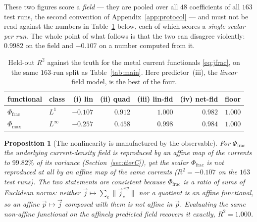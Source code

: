 \documentclass[11pt,a4paper]{article}
\theoremstyle{plain}
\newtheorem{proposition}{Proposition}
\theoremstyle{definition}
\theoremstyle{remark}
\begin{document}
These two figures score a \emph{field} --- they are pooled over all $48$
coefficients of all $163$ test runs, the second convention of
Appendix~\ref{app:protocol} --- and must not be read against the numbers in
Table~\ref{tab:tierC} below, each of which scores a \emph{single scalar per
run}. The whole point of what follows is that the two can disagree violently:
$0.9982$ on the field and $-0.107$ on a number computed from it.

\begin{table}[t]
\centering
\small
\begin{tabular}{@{}llrrrrr@{}}
\toprule
functional & class & (i) lin & (ii) quad & (iii) lin-fld & (iv) net-fld & floor \\
\midrule
$\Phi_{\mathrm{frac}}$ & $L^1$      & $-0.107$ & $0.912$ & $\mathbf{1.000}$ & $0.982$ & $1.000$ \\
$\Phi_{\max}$          & $L^\infty$ & $-0.257$ & $0.458$ & $\mathbf{0.998}$ & $0.984$ & $1.000$ \\
\bottomrule
\end{tabular}
\caption{Held-out $R^2$ against the truth for the metal current functionals
\eqref{eq:jfrac}, on the same $163$-run split as Table~\ref{tab:main}. Here
predictor~(iii), the \emph{linear} field model, is the best of the four.}
\label{tab:tierC}
\end{table}

\begin{proposition}[The nonlinearity is manufactured by the observable]
\label{prop:manufactured}
For $\Phi_{\mathrm{frac}}$ the underlying current-density \emph{field} is
reproduced by an affine map of the currents to $99.82\%$ of its variance
(Section~\ref{sec:tierC}), yet the \emph{scalar}
$\Phi_{\mathrm{frac}}$ is not reproduced at all by an affine map of the same
currents ($R^2 = -0.107$ on the $163$ test runs). The two statements are
consistent because $\Phi_{\mathrm{frac}}$ is a \emph{ratio of sums of Euclidean
norms}: neither $\vec{j}\mapsto\sum_e\|\vec{j}^{\,xy}_e\|$ nor a quotient is an
affine functional, so an affine $\vec{p}\mapsto\vec{j}$ composed with them is not
affine in $\vec{p}$. Evaluating the same non-affine functional on the affinely
predicted field recovers it exactly, $R^2 = 1.000$.
\end{proposition}

\label{rem:chapter2-correction}
\end{document}
